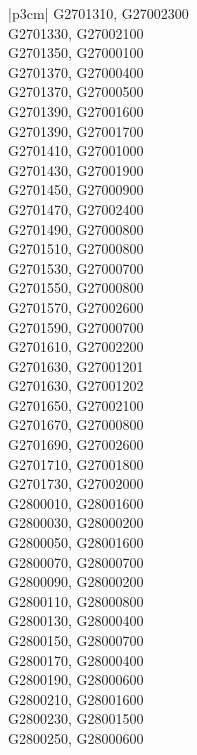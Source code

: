 \begin{customLongTable}{ |p{3cm}| }
G2701310, G27002300 \\ \hline
G2701330, G27002100 \\ \hline
G2701350, G27000100 \\ \hline
G2701370, G27000400 \\ \hline
G2701370, G27000500 \\ \hline
G2701390, G27001600 \\ \hline
G2701390, G27001700 \\ \hline
G2701410, G27001000 \\ \hline
G2701430, G27001900 \\ \hline
G2701450, G27000900 \\ \hline
G2701470, G27002400 \\ \hline
G2701490, G27000800 \\ \hline
G2701510, G27000800 \\ \hline
G2701530, G27000700 \\ \hline
G2701550, G27000800 \\ \hline
G2701570, G27002600 \\ \hline
G2701590, G27000700 \\ \hline
G2701610, G27002200 \\ \hline
G2701630, G27001201 \\ \hline
G2701630, G27001202 \\ \hline
G2701650, G27002100 \\ \hline
G2701670, G27000800 \\ \hline
G2701690, G27002600 \\ \hline
G2701710, G27001800 \\ \hline
G2701730, G27002000 \\ \hline
G2800010, G28001600 \\ \hline
G2800030, G28000200 \\ \hline
G2800050, G28001600 \\ \hline
G2800070, G28000700 \\ \hline
G2800090, G28000200 \\ \hline
G2800110, G28000800 \\ \hline
G2800130, G28000400 \\ \hline
G2800150, G28000700 \\ \hline
G2800170, G28000400 \\ \hline
G2800190, G28000600 \\ \hline
G2800210, G28001600 \\ \hline
G2800230, G28001500 \\ \hline
G2800250, G28000600 \\ \hline

\end{customLongTable}
